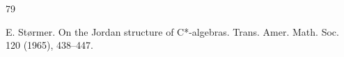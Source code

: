 \documentclass[leqno]{article} %
\numberwithin{equation}{section}
\begin{document}
\begin{thebibliography}{79}






E. St\o rmer.
\newblock On the Jordan structure of C*-algebras.
\newblock Trans. Amer. Math. Soc. 120 (1965), 438--447.







\end{thebibliography}
\end{document}
